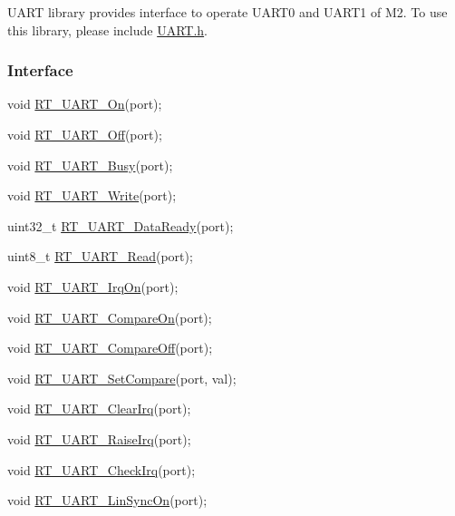 U\+A\+RT library provides interface to operate U\+A\+R\+T0 and U\+A\+R\+T1 of M2. To use this library, please include {\ttfamily \mbox{\hyperlink{a00173}{U\+A\+R\+T.\+h}}}.

\subsubsection*{Interface}


\begin{DoxyCode}
\textcolor{keywordtype}{void} \mbox{\hyperlink{a00173_a7c1428a7b16eec7fe710679dd70b4069}{RT\_UART\_On}}(port);

\textcolor{keywordtype}{void} \mbox{\hyperlink{a00173_a60de547d761052a56b69e4a75493b831}{RT\_UART\_Off}}(port);

\textcolor{keywordtype}{void} \mbox{\hyperlink{a00173_a3ab834a97a200601f16b923a705f3f01}{RT\_UART\_Busy}}(port);

\textcolor{keywordtype}{void} \mbox{\hyperlink{a00173_a3c30d4d2e260d1c2f96747e9d7bdaf0d}{RT\_UART\_Write}}(port);

uint32\_t \mbox{\hyperlink{a00173_abd2a573ae35e4f6381f9f9758a12806b}{RT\_UART\_DataReady}}(port);

uint8\_t \mbox{\hyperlink{a00173_a7804645fb092b24545278660f6b66409}{RT\_UART\_Read}}(port);

\textcolor{keywordtype}{void} \mbox{\hyperlink{a00173_a5ed058b5d506df45c51358b8451550ad}{RT\_UART\_IrqOn}}(port);

\textcolor{keywordtype}{void} \mbox{\hyperlink{a00173_aab5e3da11e9f9d531cab23aa451d2356}{RT\_UART\_CompareOn}}(port);

\textcolor{keywordtype}{void} \mbox{\hyperlink{a00173_aab59c28b31f6d93c8400c2af10cc0b05}{RT\_UART\_CompareOff}}(port);

\textcolor{keywordtype}{void} \mbox{\hyperlink{a00173_a432520c6f67a10918aa07884250a7cbc}{RT\_UART\_SetCompare}}(port, val);

\textcolor{keywordtype}{void} \mbox{\hyperlink{a00173_a84e87fc64f3149f1d5171ddca5719220}{RT\_UART\_ClearIrq}}(port);

\textcolor{keywordtype}{void} \mbox{\hyperlink{a00173_ad8934a303c429b70176995f2dd6ac67b}{RT\_UART\_RaiseIrq}}(port);

\textcolor{keywordtype}{void} \mbox{\hyperlink{a00173_a3e29e879f76b82a13419f4d59a1c3053}{RT\_UART\_CheckIrq}}(port);

\textcolor{keywordtype}{void} \mbox{\hyperlink{a00173_a49f9d43f5fd87ceed952123010e015fa}{RT\_UART\_LinSyncOn}}(port);


\end{DoxyCode}
